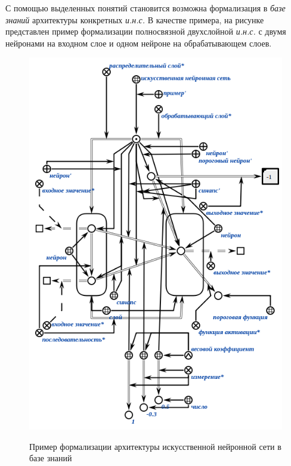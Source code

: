 \begin{SCn}
\end{SCn}

\begin{SCn}
\end{SCn}

С помощью выделенных понятий становится возможна формализация в \textit{базе знаний} архитектуры конкретных \textit{и.н.с.} В качестве примера, на рисунке \textit{} представлен пример формализации полносвязной двухслойной \textit{и.н.с.} с двумя нейронами на входном слое и одном нейроне на обрабатывающем слоев.

\begin{figure}
	\centering
	\caption{Пример формализации архитектуры искусственной нейронной сети в базе знаний}
	\includegraphics[width=0.8\linewidth]{author/part3/figures/neural_network_scg.png}
	\label{fig:neural_network_scg}
\end{figure}

